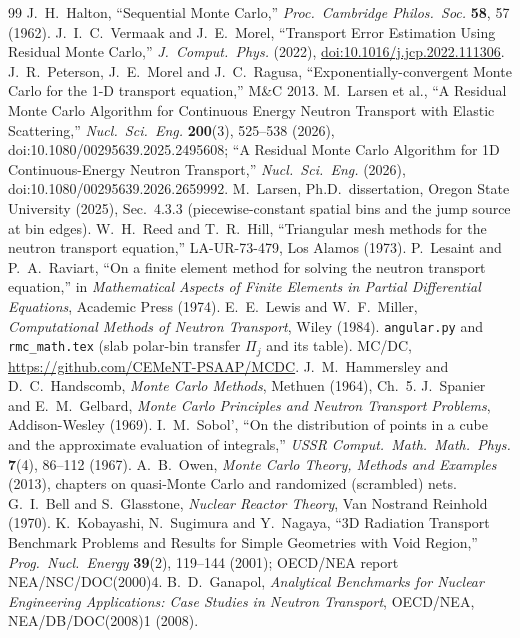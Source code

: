 \documentclass[11pt]{article}
\begin{document}
\begin{thebibliography}{99}
 J.~H.~Halton, ``Sequential Monte Carlo,'' \emph{Proc.\ Cambridge
  Philos.\ Soc.} \textbf{58}, 57 (1962).
 J.~I.~C.~Vermaak and J.~E.~Morel, ``Transport Error Estimation Using
  Residual Monte Carlo,'' \emph{J.\ Comput.\ Phys.} (2022),
  \href{https://doi.org/10.1016/j.jcp.2022.111306}{doi:10.1016/j.jcp.2022.111306}.
 J.~R.~Peterson, J.~E.~Morel and J.~C.~Ragusa,
  ``Exponentially-convergent Monte Carlo for the 1-D transport equation,'' M\&C 2013.
 M.~Larsen et al., ``A Residual Monte Carlo Algorithm for Continuous
  Energy Neutron Transport with Elastic Scattering,'' \emph{Nucl.\ Sci.\ Eng.}
  \textbf{200}(3), 525--538 (2026), doi:10.1080/00295639.2025.2495608;
  ``A Residual Monte Carlo Algorithm for 1D Continuous-Energy Neutron Transport,''
  \emph{Nucl.\ Sci.\ Eng.} (2026), doi:10.1080/00295639.2026.2659992.
 M.~Larsen, Ph.D.\ dissertation, Oregon State University (2025),
  Sec.~4.3.3 (piecewise-constant spatial bins and the jump source at bin edges).
 W.~H.~Reed and T.~R.~Hill, ``Triangular mesh methods for the neutron
  transport equation,'' LA-UR-73-479, Los Alamos (1973).
 P.~Lesaint and P.~A.~Raviart, ``On a finite element method for
  solving the neutron transport equation,'' in \emph{Mathematical Aspects of Finite
  Elements in Partial Differential Equations}, Academic Press (1974).
 E.~E.~Lewis and W.~F.~Miller, \emph{Computational Methods of Neutron
  Transport}, Wiley (1984).
 \texttt{angular.py} and \texttt{rmc\_math.tex} (slab polar-bin
  transfer $\Pi_j$ and its table).
 MC/DC, \url{https://github.com/CEMeNT-PSAAP/MCDC}.
 J.~M.~Hammersley and D.~C.~Handscomb, \emph{Monte Carlo
  Methods}, Methuen (1964), Ch.~5.
 J.~Spanier and E.~M.~Gelbard, \emph{Monte Carlo Principles and
  Neutron Transport Problems}, Addison-Wesley (1969).
 I.~M.~Sobol', ``On the distribution of points in a cube and the
  approximate evaluation of integrals,'' \emph{USSR Comput.\ Math.\ Math.\ Phys.}
  \textbf{7}(4), 86--112 (1967).
 A.~B.~Owen, \emph{Monte Carlo Theory, Methods and Examples} (2013),
  chapters on quasi-Monte Carlo and randomized (scrambled) nets.
 G.~I.~Bell and S.~Glasstone, \emph{Nuclear Reactor Theory}, Van
  Nostrand Reinhold (1970).
 K.~Kobayashi, N.~Sugimura and Y.~Nagaya, ``3D Radiation Transport
  Benchmark Problems and Results for Simple Geometries with Void Region,''
  \emph{Prog.\ Nucl.\ Energy} \textbf{39}(2), 119--144 (2001); OECD/NEA report
  NEA/NSC/DOC(2000)4.
 B.~D.~Ganapol, \emph{Analytical Benchmarks for Nuclear Engineering
  Applications: Case Studies in Neutron Transport}, OECD/NEA, NEA/DB/DOC(2008)1
  (2008).
\end{thebibliography}
\end{document}

